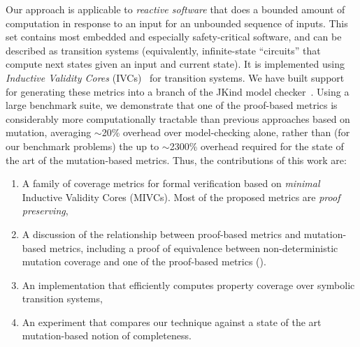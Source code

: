 Our approach is applicable to {\em reactive software} that does a bounded amount of computation in response to an input for an unbounded sequence of inputs.  This set contains most embedded and especially safety-critical software, and can be described as transition systems (equivalently, infinite-state ``circuits'' that compute next states given an input and current state).
It is implemented using {\em Inductive Validity Cores} (IVCs)~\cite{Ghass16} for transition systems.
We have built support for generating these metrics into a branch of the JKind model checker~\cite{jkind}.  Using a large benchmark suite, we demonstrate that one of the proof-based metrics is considerably more computationally tractable than previous approaches based on mutation, averaging ${\sim}$20\% overhead over model-checking alone, rather than (for our benchmark problems) the up to ${\sim}$2300\% overhead required for the state of the art of the mutation-based metrics.  
Thus, the contributions of this work are:
\begin{enumerate}
\item A family of coverage metrics for formal verification based on \emph{minimal} Inductive Validity Cores (MIVCs).  Most of the proposed metrics are {\em proof preserving},
\item A discussion of the relationship between proof-based metrics and mutation-based metrics, including a proof of equivalence between non-deterministic mutation coverage and one of the proof-based metrics (\mustcov).
\item An implementation that efficiently computes property coverage over symbolic transition systems,
\item An experiment that compares our technique against a state of the art mutation-based notion of completeness.
\end{enumerate}


\iffalse
The rest of the paper is organized as follows.  In Section~\ref{sec:example}, we present a running example to illustrate the concepts formalized throughout the paper.  In Section~\ref{sec:background}, we provide the formal preliminaries for the approach and some background on mutation-based coverage notions.  Section~\ref{sec:method} presents proof-based coverage metrics.
Section~\ref{sec:illust} illustrates the assessment of requirements completeness with the new metrics. Section~\ref{sec:impl} provides detail on implementation. Section~\ref{sec:experiments} describes an experiment to evaluate our algorithm.
Section~\ref{sec:discussion} provides a discussion.  In Section~\ref{sec:related}, we cover related work.  Finally, Section~\ref{sec:conclusion} mentions some conclusions.
\fi
